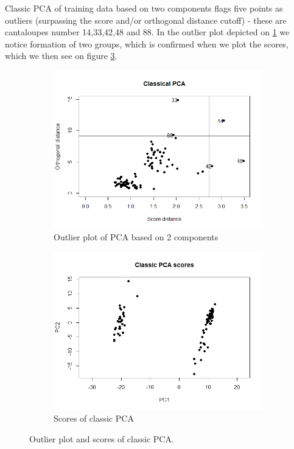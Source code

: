 \documentclass[12pt]{article}
\begin{document}
Classic PCA of training data based on two components flags five points as outliers (surpassing the score and/or orthogonal distance cutoff) - these are cantaloupes 
number 14,33,42,48 and 88. In the outlier plot depicted on \ref{fig:outlierClassic} we notice formation of two groups, which is confirmed when we plot the scores, which
we then see on figure \ref{fig:scoresClassic}.

\begin{figure}[h!]
  \begin{subfigure}[b]{0.5\linewidth}
      \centering
      \includegraphics[width=\textwidth]{../images/outliersClassic.png}
   \caption{Outlier plot of PCA based on 2 components}\label{fig:outlierClassic}
  \end{subfigure}%
  \begin{subfigure}[b]{0.5\linewidth}
      \centering
   \includegraphics[width=\textwidth]{../images/ClassicPCAScores.png}
   \caption{Scores of classic PCA}\label{fig:scoresClassic}
  \end{subfigure}%
 \caption{Outlier plot and scores of classic PCA.}
\end{figure}
\end{document}
